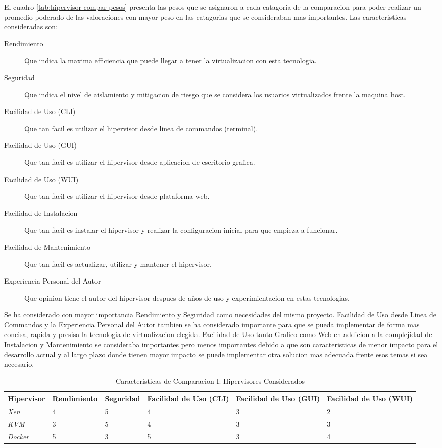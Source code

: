El cuadro \ref{tab:hipervisor-compar-pesos} presenta las pesos que se asignaron a cada catagoria de la comparacion para poder realizar un promedio poderado de las valoraciones con mayor peso en las catagorias que se consideraban mas importantes. Las caracteristicas consideradas son:
\begin{description}
	\item[Rendimiento] Que indica la maxima efficiencia que puede llegar a tener la virtualizacion con esta tecnologia.
    \item[Seguridad] Que indica el nivel de aislamiento y mitigacion de riesgo que se considera los usuarios virtualizados frente la maquina host.
    \item[Facilidad de Uso (CLI)] Que tan facil es utilizar el hipervisor desde linea de commandos (terminal).
    \item[Facilidad de Uso (GUI)] Que tan facil es utilizar el hipervisor desde aplicacion de escritorio grafica.
    \item[Facilidad de Uso (WUI)] Que tan facil es utilizar el hipervisor desde plataforma web.
    \item[Facilidad de Instalacion] Que tan facil es instalar el hipervisor y realizar la configuracion inicial para que empieza a funcionar.
    \item[Facilidad de Mantenimiento] Que tan facil es actualizar, utilizar y mantener el hipervisor.
    \item[Experiencia Personal del Autor] Que opinion tiene el autor del hipervisor despues de años de uso y experimientacion en estas tecnologias.
\end{description}
Se ha considerado con mayor importancia Rendimiento y Seguridad como necesidades del mismo proyecto. Facilidad de Uso desde Linea de Commandos y la Experiencia Personal del Autor tambien se ha considerado importante para que se pueda implementar de forma mas concisa, rapida y presisa la tecnologia de virtualizacion elegida. Facilidad de Uso tanto Grafico como Web en addicion a la complejidad de Instalacion y Mantenimiento se consideraba importantes pero menos importantes debido a que son caracteristicas de menor impacto para el desarrollo actual y al largo plazo donde tienen mayor impacto se puede implementar otra solucion mas adecuada frente esos temas si sea necesario. 

\begin{table}
	\centering
	\begin{tabular}{|p{1.85cm}|p{2.25cm}|p{1.8cm}|p{1.7cm}|p{1.7cm}|p{1.7cm}|}
    	\hline
		\textbf{Hipervisor} & \textbf{Rendimiento} & \textbf{Seguridad} & \textbf{Facilidad de Uso (CLI)} & \textbf{Facilidad de Uso (GUI)} & \textbf{Facilidad de Uso (WUI)} \\
        \hline
        \textit{Xen} & 4 & 5 & 4 & 3 & 2 \\
        \hline
        \textit{KVM} & 3 & 5 & 4 & 3 & 3 \\
        \hline
        \textit{Docker} & 5 & 3 & 5 & 3 & 4 \\
        \hline
	\end{tabular}
    \caption{Caracteristicas de Comparacion I: Hipervisores Considerados}
    \label{tab:hipervisor-compar-i}
\end{table}

